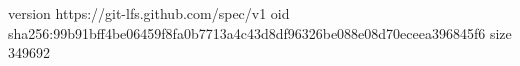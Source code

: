 version https://git-lfs.github.com/spec/v1
oid sha256:99b91bff4be06459f8fa0b7713a4c43d8df96326be088e08d70eceea396845f6
size 349692
